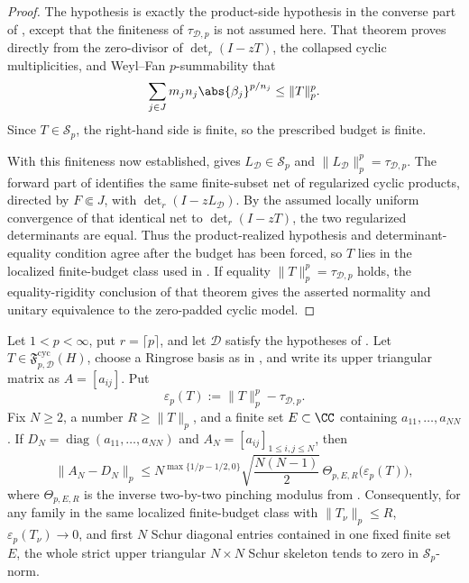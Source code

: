 \begin{proof}
  The hypothesis is exactly the product-side hypothesis in the converse part
  of , except that the
  finiteness of \(\tau_{\mathcal D,p}\) is not assumed here.  That theorem
  proves directly from the zero-divisor of \(\det_r(I-zT)\), the collapsed
  cyclic multiplicities, and Weyl--Fan \(p\)-summability that
  \[
    \sum_{j\in J}m_jn_j\abs{\beta_j}^{p/n_j}
    \le \|T\|_p^p.
  \]
  Since \(T\in\mathcal S_p\), the right-hand side is finite, so the
  prescribed budget is finite.

  With this finiteness now established,
   gives
  \(L_{\mathcal D}\in\mathcal S_p\) and
  \(\|L_{\mathcal D}\|_p^p=\tau_{\mathcal D,p}\).  The forward part of
   identifies the same
  finite-subset net of regularized cyclic products, directed by
  \(F\Subset J\), with \(\det_r(I-zL_{\mathcal D})\).  By the assumed
  locally uniform convergence of that identical net to \(\det_r(I-zT)\), the
  two regularized determinants are equal.  Thus the product-realized hypothesis
  and determinant-equality condition agree after the budget has been forced, so
  \(T\) lies in the localized finite-budget class used in
  .  If equality
  \(\|T\|_p^p=\tau_{\mathcal D,p}\) holds, the equality-rigidity conclusion of
  that theorem gives the asserted normality and unitary equivalence to the
  zero-padded cyclic model.
\end{proof}
\begin{corollary}
  \label{cor:prescribed-schatten-finite-skeleton-freezing}
  Let \(1<p<\infty\), put \(r=\lceil p\rceil\), and let \(\mathcal D\)
  satisfy the hypotheses of
  .  Let
  \(T\in\mathfrak F_{p,\mathcal D}^{\mathrm{cyc}}(H)\), choose a Ringrose
  basis as in , and write its
  upper triangular matrix as \(A=[a_{ij}]\).  Put
  \[
    \varepsilon_p(T):=\|T\|_p^p-\tau_{\mathcal D,p}.
  \]
  Fix \(N\ge2\), a number \(R\ge\|T\|_p\), and a finite set
  \(E\subset\CC\) containing \(a_{11},\ldots,a_{NN}\).  If
  \(D_N=\operatorname{diag}(a_{11},\ldots,a_{NN})\) and
  \(A_N=[a_{ij}]_{1\le i,j\le N}\), then
  \[
    \|A_N-D_N\|_p
    \le
    N^{\max\{1/p-1/2,0\}}
    \sqrt{\frac{N(N-1)}{2}}\,
    \Theta_{p,E,R}\bigl(\varepsilon_p(T)\bigr),
  \]
  where \(\Theta_{p,E,R}\) is the inverse two-by-two pinching modulus from
  .  Consequently, for any
  family in the same localized finite-budget class
  with \(\|T_\nu\|_p\le R\),
  \(\varepsilon_p(T_\nu)\to0\), and first \(N\) Schur diagonal entries
  contained in one fixed finite set \(E\), the whole strict upper triangular
  \(N\times N\) Schur skeleton tends to zero in \(\mathcal S_p\)-norm.
\end{corollary}

